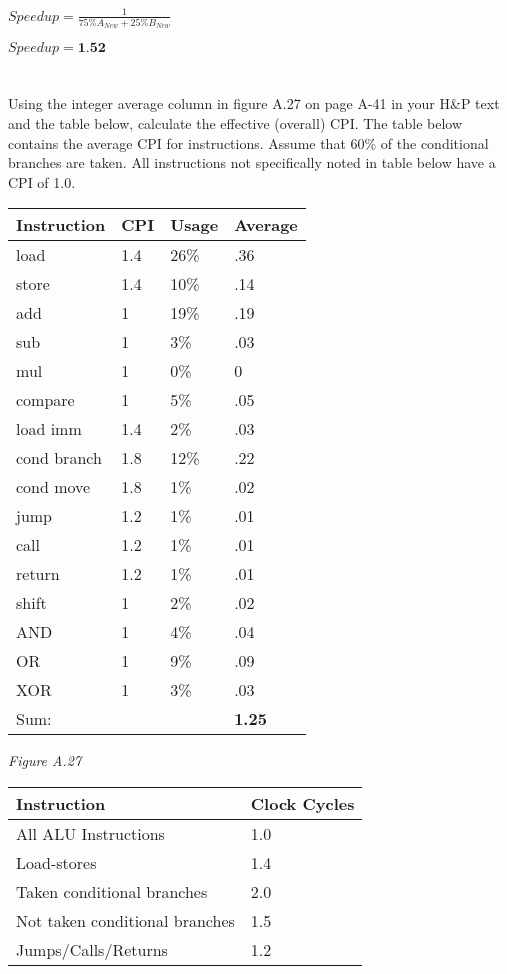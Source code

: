 \documentclass{article}
\begin{document}
\begin{adjustwidth}{2.5em}{0pt}
\vspace{5mm} 
$Speedup=\frac{1}{75\%A_{New}+25\%B_{New}}$

\vspace{3mm}
$Speedup=\textbf{1.52}$
\pagebreak
\section{}

Using the integer average column in figure A.27 on page A-41 in your H\&P text and the table below, calculate the effective (overall) CPI. The table below contains the average CPI for instructions. Assume that 60\% of the conditional branches are taken. All instructions not specifically noted in table below have a CPI of 1.0.

\vspace{5mm}

\begin{multicols}{2}
\begin{minipage}{\linewidth}
\begin{tabular}{|l|l|l|l|}
\hline
\textbf{Instruction} & \textbf{CPI} & \textbf{Usage} & \textbf{Average} \\
\hline
load & 1.4 & 26\% & .36 \\
store & 1.4 & 10\% & .14  \\
add & 1 & 19\% & .19 \\
sub & 1 & 3\% & .03\\
mul & 1 & 0\% & 0 \\
compare & 1 & 5\% & .05 \\
load imm & 1.4 & 2\% & .03\\
cond branch & 1.8 & 12\% & .22\\
cond move & 1.8 & 1\% & .02\\
jump & 1.2 & 1\% & .01\\ 
call & 1.2 & 1\% & .01\\
return & 1.2 & 1\% & .01\\
shift & 1 & 2\% & .02 \\
AND & 1 & 4\% & .04 \\
OR & 1 & 9\% & .09 \\
XOR & 1 & 3\% & .03 \\
\hline
\multicolumn{3}{|l|}{Sum:} & \textbf{1.25} \\
\hline
\end{tabular}\par
\bigskip\textit{Figure A.27}
\end{minipage}

\begin{tabular}{|l|l|}
\hline
\textbf{Instruction} & \textbf{Clock Cycles} \\
\hline
All ALU Instructions & 1.0 \\
Load-stores & 1.4 \\
Taken conditional branches & 2.0 \\ 
Not taken conditional branches & 1.5 \\ 
Jumps/Calls/Returns & 1.2 \\
\hline
\end{tabular}	
\end{multicols}
\end{adjustwidth}
\end{document}
